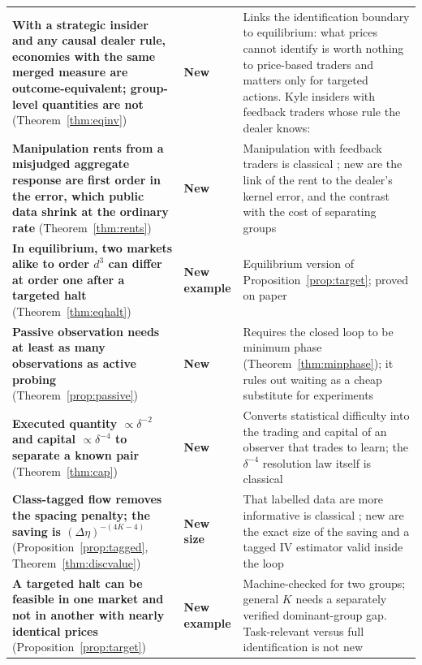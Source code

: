 \documentclass[12pt]{article}
\theoremstyle{definition}
\theoremstyle{remark}
\begin{document}
\begin{table}[!t]
\begin{tabularx}{\textwidth}{>{\raggedright\arraybackslash}p{}>{\raggedright\arraybackslash}p{}X}
\textbf{With a strategic insider and any causal dealer rule, economies with the same merged measure are outcome-equivalent; group-level quantities are not} (Theorem~\ref{thm:eqinv}) & \textbf{New} & Links the identification boundary to equilibrium: what prices cannot identify is worth nothing to price-based traders and matters only for targeted actions. Kyle insiders with feedback traders whose rule the dealer knows: \citet{noh2026}\\
\textbf{Manipulation rents from a misjudged aggregate response are first order in the error, which public data shrink at the ordinary rate} (Theorem~\ref{thm:rents}) & \textbf{New} & Manipulation with feedback traders is classical \citep{delong1990,allen1992}; new are the link of the rent to the dealer's kernel error, and the contrast with the cost of separating groups\\
\textbf{In equilibrium, two markets alike to order $d^3$ can differ at order one after a targeted halt} (Theorem~\ref{thm:eqhalt}) & \textbf{New example} & Equilibrium version of Proposition~\ref{prop:target}; proved on paper\\
\textbf{Passive observation needs at least as many observations as active probing} (Theorem~\ref{prop:passive}) & \textbf{New} & Requires the closed loop to be minimum phase (Theorem~\ref{thm:minphase}); it rules out waiting as a cheap substitute for experiments\\
\textbf{Executed quantity $\propto\delta^{-2}$ and capital $\propto\delta^{-4}$ to separate a known pair} (Theorem~\ref{thm:cap}) & \textbf{New} & Converts statistical difficulty into the trading and capital of an observer that trades to learn; the $\delta^{-4}$ resolution law itself is classical \citep{shahram2005}\\
\textbf{Class-tagged flow removes the spacing penalty; the saving is $(\Delta\eta)^{-(4K-4)}$} (Proposition~\ref{prop:tagged}, Theorem~\ref{thm:discvalue}) & \textbf{New size} & That labelled data are more informative is classical \citep{castelli1996}; new are the exact size of the saving and a tagged IV estimator valid inside the loop\\
\textbf{A targeted halt can be feasible in one market and not in another with nearly identical prices} (Proposition~\ref{prop:target}) & \textbf{New example} & Machine-checked for two groups; general $K$ needs a separately verified dominant-group gap. Task-relevant versus full identification is not new \citep{vanwaarde2020,wagenmaker2021}\\
\bottomrule
\end{tabularx}
\end{table}
\end{document}
